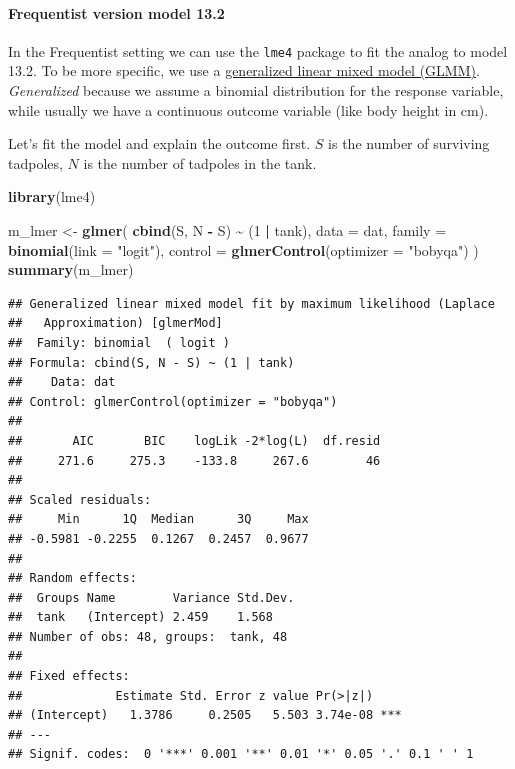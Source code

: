 \documentclass[
]{book}
\newenvironment{Shaded}{\begin{snugshade}}{\end{snugshade}}
\newcommand{\AttributeTok}[1]{\textcolor[rgb]{0.13,0.29,0.53}{#1}}
\newcommand{\DecValTok}[1]{\textcolor[rgb]{0.00,0.00,0.81}{#1}}
\newcommand{\FunctionTok}[1]{\textcolor[rgb]{0.13,0.29,0.53}{\textbf{#1}}}
\newcommand{\NormalTok}[1]{#1}
\newcommand{\OtherTok}[1]{\textcolor[rgb]{0.56,0.35,0.01}{#1}}
\newcommand{\SpecialCharTok}[1]{\textcolor[rgb]{0.81,0.36,0.00}{\textbf{#1}}}
\newcommand{\StringTok}[1]{\textcolor[rgb]{0.31,0.60,0.02}{#1}}
\begin{document}
\paragraph{Frequentist version model 13.2}\label{frequentist13_2}

In the Frequentist setting we can use the \texttt{lme4} package to fit the analog
to model 13.2. To be more specific,
we use a \href{https://en.wikipedia.org/wiki/Generalized_linear_mixed_model}{generalized linear mixed model (GLMM)}.
\emph{Generalized} because we assume a binomial distribution for the response variable,
while usually we have a continuous outcome variable (like body height in cm).

Let's fit the model and explain the outcome first. \(S\) is the number of surviving tadpoles,
\(N\) is the number of tadpoles in the tank.

\begin{Shaded}
\begin{Highlighting}[]
\FunctionTok{library}\NormalTok{(lme4)}

\NormalTok{m\_lmer }\OtherTok{\textless{}{-}} \FunctionTok{glmer}\NormalTok{(}
  \FunctionTok{cbind}\NormalTok{(S, N }\SpecialCharTok{{-}}\NormalTok{ S) }\SpecialCharTok{\textasciitilde{}}\NormalTok{ (}\DecValTok{1} \SpecialCharTok{|}\NormalTok{ tank),}
  \AttributeTok{data =}\NormalTok{ dat,}
  \AttributeTok{family =} \FunctionTok{binomial}\NormalTok{(}\AttributeTok{link =} \StringTok{"logit"}\NormalTok{),}
  \AttributeTok{control =} \FunctionTok{glmerControl}\NormalTok{(}\AttributeTok{optimizer =} \StringTok{"bobyqa"}\NormalTok{)}
\NormalTok{)}
\FunctionTok{summary}\NormalTok{(m\_lmer)}
\end{Highlighting}
\end{Shaded}

\begin{verbatim}
## Generalized linear mixed model fit by maximum likelihood (Laplace
##   Approximation) [glmerMod]
##  Family: binomial  ( logit )
## Formula: cbind(S, N - S) ~ (1 | tank)
##    Data: dat
## Control: glmerControl(optimizer = "bobyqa")
## 
##       AIC       BIC    logLik -2*log(L)  df.resid 
##     271.6     275.3    -133.8     267.6        46 
## 
## Scaled residuals: 
##     Min      1Q  Median      3Q     Max 
## -0.5981 -0.2255  0.1267  0.2457  0.9677 
## 
## Random effects:
##  Groups Name        Variance Std.Dev.
##  tank   (Intercept) 2.459    1.568   
## Number of obs: 48, groups:  tank, 48
## 
## Fixed effects:
##             Estimate Std. Error z value Pr(>|z|)    
## (Intercept)   1.3786     0.2505   5.503 3.74e-08 ***
## ---
## Signif. codes:  0 '***' 0.001 '**' 0.01 '*' 0.05 '.' 0.1 ' ' 1
\end{verbatim}
\end{document}
